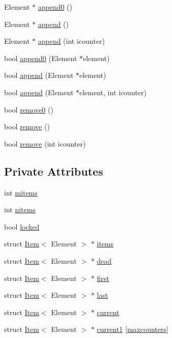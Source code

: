 \begin{CompactItemize}
\item 
Element $\ast$ \hyperlink{classCollection_527bca208e29a6fe75053e054cfc1835}{append0} ()
\item 
Element $\ast$ \hyperlink{classCollection_fcf23b25470a1695983118c153244838}{append} ()
\item 
Element $\ast$ \hyperlink{classCollection_c80cf8e48d9d4363eea79d46c682b468}{append} (int icounter)
\item 
bool \hyperlink{classCollection_b89740f405067954a0e0c62d8f5b4faa}{append0} (Element $\ast$element)
\item 
bool \hyperlink{classCollection_026fa2048a7922f82c3dd6a3a29a5583}{append} (Element $\ast$element)
\item 
bool \hyperlink{classCollection_f510892bc93afe0cfc889a2dec875e51}{append} (Element $\ast$element, int icounter)
\item 
bool \hyperlink{classCollection_d106f32d2b9201c2d6bf37912387d4f6}{remove0} ()
\item 
bool \hyperlink{classCollection_167f3b300994369663deef64361affa9}{remove} ()
\item 
bool \hyperlink{classCollection_c14a82d2f927c0e8fc43213c91612e2b}{remove} (int icounter)
\end{CompactItemize}
\subsection*{Private Attributes}
\begin{CompactItemize}
\item 
int \hyperlink{classCollection_f9021665376590331cb1f8c759b949ea}{mitems}
\item 
int \hyperlink{classCollection_df47f62cd4ec8aac331a4af10ed5e690}{nitems}
\item 
bool \hyperlink{classCollection_1780bf38d158ceb26302c9a4956757d0}{locked}
\item 
struct \hyperlink{structItem}{Item}$<$ Element $>$ $\ast$ \hyperlink{classCollection_a0de31b7883b3920f0e049710517b7bb}{items}
\item 
struct \hyperlink{structItem}{Item}$<$ Element $>$ $\ast$ \hyperlink{classCollection_f67771496391118583fcebee252a96cc}{dead}
\item 
struct \hyperlink{structItem}{Item}$<$ Element $>$ $\ast$ \hyperlink{classCollection_976b583be3920e77c69b754e09d0cae4}{first}
\item 
struct \hyperlink{structItem}{Item}$<$ Element $>$ $\ast$ \hyperlink{classCollection_fc2fe7eb6eda33100b7bfd6dedbe38cc}{last}
\item 
struct \hyperlink{structItem}{Item}$<$ Element $>$ $\ast$ \hyperlink{classCollection_9a563b3861767ca3dbed06dc587dd972}{current}
\item 
struct \hyperlink{structItem}{Item}$<$ Element $>$ $\ast$ \hyperlink{classCollection_7b976f15029014ee3e7a168d19dbe324}{current1} \mbox{[}\hyperlink{def_8h_70cd7898027f297d8d8d478b87f896d2}{maxcounters}\mbox{]}
\end{CompactItemize}



